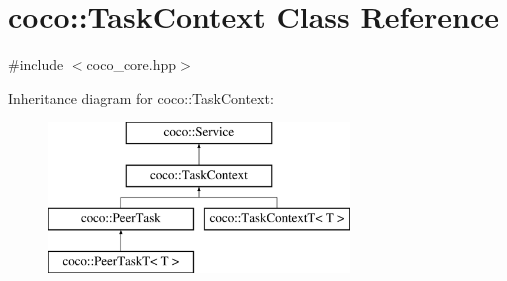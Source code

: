 \hypertarget{classcoco_1_1_task_context}{}\section{coco\+:\+:Task\+Context Class Reference}
\label{classcoco_1_1_task_context}


{\ttfamily \#include $<$coco\+\_\+core.\+hpp$>$}

Inheritance diagram for coco\+:\+:Task\+Context\+:\begin{figure}[H]
\begin{center}
\leavevmode
\includegraphics[height=4.000000cm]{classcoco_1_1_task_context}
\end{center}
\end{figure}
